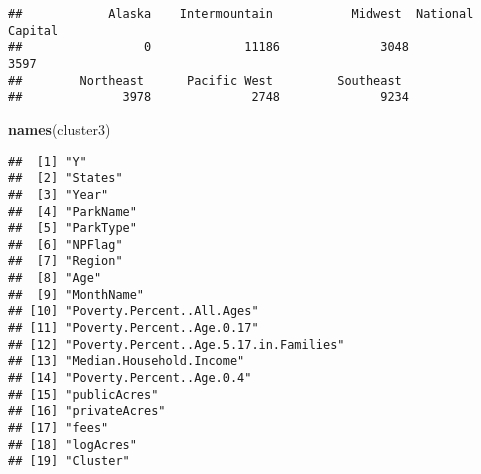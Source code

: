 \documentclass[
]{article}
\newenvironment{Shaded}{\begin{snugshade}}{\end{snugshade}}
\newcommand{\KeywordTok}[1]{\textcolor[rgb]{0.13,0.29,0.53}{\textbf{#1}}}
\newcommand{\NormalTok}[1]{#1}
\newcommand{\OperatorTok}[1]{\textcolor[rgb]{0.81,0.36,0.00}{\textbf{#1}}}
\begin{document}
\begin{Shaded}
\end{Shaded}

\begin{verbatim}
##            Alaska    Intermountain           Midwest  National Capital  
##                 0             11186              3048              3597 
##        Northeast      Pacific West         Southeast  
##              3978              2748              9234
\end{verbatim}

\begin{Shaded}
\begin{Highlighting}[]
\KeywordTok{names}\NormalTok{(cluster3)}
\end{Highlighting}
\end{Shaded}

\begin{verbatim}
##  [1] "Y"                                    
##  [2] "States"                               
##  [3] "Year"                                 
##  [4] "ParkName"                             
##  [5] "ParkType"                             
##  [6] "NPFlag"                               
##  [7] "Region"                               
##  [8] "Age"                                  
##  [9] "MonthName"                            
## [10] "Poverty.Percent..All.Ages"            
## [11] "Poverty.Percent..Age.0.17"            
## [12] "Poverty.Percent..Age.5.17.in.Families"
## [13] "Median.Household.Income"              
## [14] "Poverty.Percent..Age.0.4"             
## [15] "publicAcres"                          
## [16] "privateAcres"                         
## [17] "fees"                                 
## [18] "logAcres"                             
## [19] "Cluster"
\end{verbatim}
\end{document}
